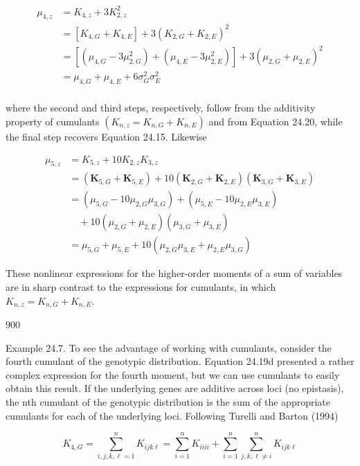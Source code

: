 \documentclass{article}
\begin{document}
\begin{equation}
\begin{aligned}\mu_{4,z}&=K_{4,z}+3K_{2,z}^{2}\\&=\left[K_{4,G}+K_{4,E}\right]+3\left(K_{2,G}+K_{2,E}\right)^{2}\\&=\left[\left(\mu_{4,G}-3\mu_{2,G}^{2}\right)+\left(\mu_{4,E}-3\mu_{2,E}^{2}\right)\right]+3\left(\mu_{2,G}+\mu_{2,E}\right)^{2}\\&=\mu_{4,G}+\mu_{4,E}+6\sigma_{G}^{2}\sigma_{E}^{2}\\ \end{aligned}
\end{equation}

where the second and third steps, respectively, follow from the additivity property of cumulants  $ (K_{n,z}=K_{n,G}+K_{n,E}) $ and from Equation 24.20, while the final step recovers Equation 24.15. Likewise

\begin{equation}
\begin{aligned}\mu_{5,z}&=K_{5,z}+10K_{2,z}K_{3,z}\\&=(\boldsymbol{K}_{5,G}+\boldsymbol{K}_{5,E})+10(\boldsymbol{K}_{2,G}+\boldsymbol{K}_{2,E})(\boldsymbol{K}_{3,G}+\boldsymbol{K}_{3,E})\\&=(\mu_{5,G}-10\mu_{2,G}\mu_{3,G})+(\mu_{5,E}-10\mu_{2,E}\mu_{3,E})\\&\quad+10(\mu_{2,G}+\mu_{2,E})(\mu_{3,G}+\mu_{3,E})\\&=\mu_{5,G}+\mu_{5,E}+10(\mu_{2,G}\mu_{3,E}+\mu_{2,E}\mu_{3,G})\end{aligned}
\end{equation}

These nonlinear expressions for the higher-order moments of a sum of variables are in sharp contrast to the expressions for cumulants, in which  $ K_{n,z} = K_{n,G} + K_{n,E} $.

900

Example 24.7. To see the advantage of working with cumulants, consider the fourth cumulant of the genotypic distribution. Equation 24.19d presented a rather complex expression for the fourth moment, but we can use cumulants to easily obtain this result. If the underlying genes are additive across loci (no epistasis), the nth cumulant of the genotypic distribution is the sum of the appropriate cumulants for each of the underlying loci. Following Turelli and Barton (1994)

\begin{equation}
K_{4,G}=\sum_{i,j,k,\ell=1}^{n}K_{i j k\ell}=\sum_{i=1}^{n}K_{i i i i}+\sum_{i=1}^{n}\sum_{j,k,\ell\neq i}^{n}K_{i j k\ell}
\end{equation}
\end{document}
